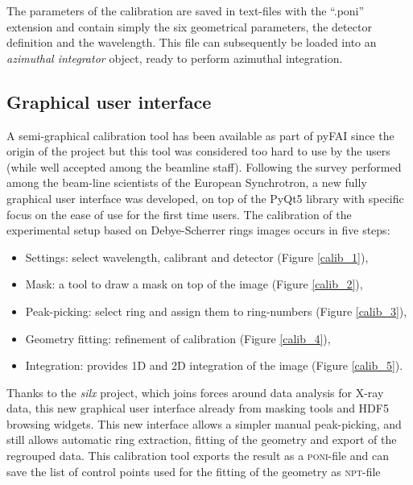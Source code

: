 \documentclass[preprint, pdf]{iucr}              %
\begin{document}
The parameters of the calibration are saved in text-files with the ``.poni''
extension and contain simply the six geometrical parameters, the detector
definition and the wavelength. 
This file can subsequently be loaded into an \textit{azimuthal integrator}
object, ready to perform azimuthal integration.

\subsection{Graphical user interface}

A semi-graphical calibration tool has been available as part of pyFAI
\cite{fv5028} since the origin of the project but this tool was considered too
hard to use by the users (while well accepted among the beamline staff).
Following the survey performed among the beam-line scientists of the European
Synchrotron, a new fully graphical user interface was developed, on top of 
the PyQt5 library \cite{pyqt} with specific focus on the ease of use for the
first time users.
The calibration of the experimental setup based on Debye-Scherrer rings images 
occurs in five steps:
\begin{itemize}
  \item Settings: select wavelength, calibrant and detector (Figure
  \ref{calib_1}),
  \item Mask: a tool to draw a mask on top of the image (Figure
  \ref{calib_2}),
  \item Peak-picking: select ring and assign them to ring-numbers (Figure
  \ref{calib_3}),
  \item Geometry fitting: refinement of calibration (Figure
  \ref{calib_4}), 
  \item Integration: provides 1D and 2D integration of the image (Figure
  \ref{calib_5}). 
\end{itemize}

Thanks to the \textit{silx} \cite{silx} project, which joins
forces around data analysis for X-ray data, this new graphical user interface
already from masking tools and HDF5 browsing widgets.
This new interface allows a simpler manual peak-picking,
and still allows automatic ring extraction, fitting of the geometry and export
of the regrouped data. 
This calibration tool exports the result as a \textsc{poni}-file and can
save the list of control points used  for the fitting of the geometry as
\textsc{npt}-file
\end{document}
